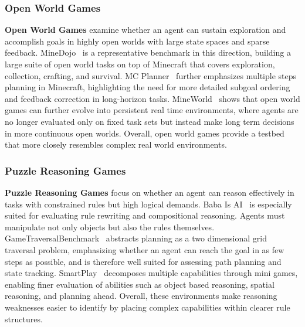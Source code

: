 \documentclass{llmxive}
\begin{document}
\subsubsection{Open World Games} 
\label{Open World Games}
\textbf{Open World Games} examine whether an agent can sustain exploration and accomplish goals in highly open worlds with large state spaces and sparse feedback. MineDojo~\cite{MineDojo} is a representative benchmark in this direction, building a large suite of open world tasks on top of Minecraft that covers exploration, collection, crafting, and survival. 
MC Planner~\cite{MC-Planner} further emphasizes multiple steps planning in Minecraft, highlighting the need for more detailed subgoal ordering and feedback correction in long-horizon tasks. MineWorld~\cite{MINEWORLD} shows that open world games can further evolve into persistent real time environments, where agents are no longer evaluated only on fixed task sets but instead make long term decisions in more continuous open worlds. Overall, open world games provide a testbed that more closely resembles complex real world environments.


\subsubsection{Puzzle Reasoning Games}
\label{Puzzle Reasoning Games}
\textbf{Puzzle Reasoning Games} focus on whether an agent can reason effectively in tasks with constrained rules but high logical demands.
Baba Is AI~\cite{BabaIsAI} is especially suited for evaluating rule rewriting and compositional reasoning. Agents must manipulate not only objects but also the rules themselves. GameTraversalBenchmark~\cite{GameTraversalBenchmark} abstracts planning as a two dimensional grid traversal problem, emphasizing whether an agent can reach the goal in as few steps as possible, and is therefore well suited for assessing path planning and state tracking. 
SmartPlay~\cite{SMARTPLAY} decomposes multiple capabilities through mini games, enabling finer evaluation of abilities such as object based reasoning, spatial reasoning, and planning ahead. Overall, these environments make reasoning weaknesses easier to identify by placing complex capabilities within clearer rule structures.
\end{document}
